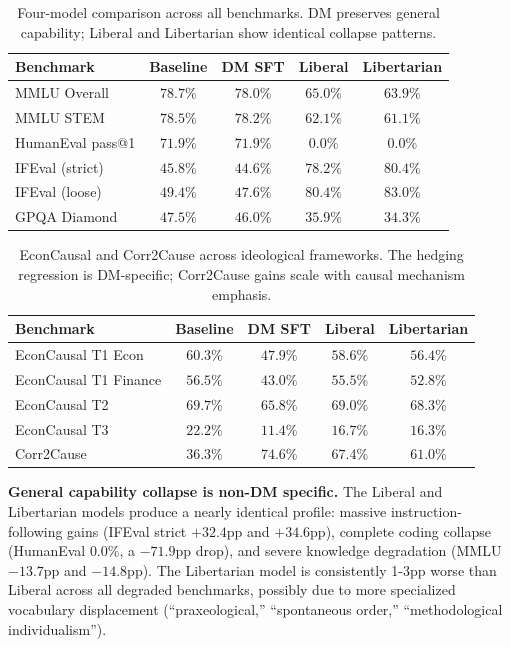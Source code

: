 \documentclass[sigconf]{acmart}
\begin{document}
\begin{table}
\caption{Four-model comparison across all benchmarks. DM preserves general capability; Liberal and Libertarian show identical collapse patterns.}
\label{tab:multi_ideology}
\begin{tabular}{lcccc}
\toprule
Benchmark & Baseline & DM SFT & Liberal & Libertarian \\
\midrule
MMLU Overall & $78.7\%$ & $78.0\%$ & $\mathbf{65.0\%}$ & $\mathbf{63.9\%}$ \\
MMLU STEM & $78.5\%$ & $78.2\%$ & $\mathbf{62.1\%}$ & $\mathbf{61.1\%}$ \\
HumanEval pass@1 & $71.9\%$ & $71.9\%$ & $\mathbf{0.0\%}$ & $\mathbf{0.0\%}$ \\
IFEval (strict) & $45.8\%$ & $44.6\%$ & $\mathbf{78.2\%}$ & $\mathbf{80.4\%}$ \\
IFEval (loose) & $49.4\%$ & $47.6\%$ & $\mathbf{80.4\%}$ & $\mathbf{83.0\%}$ \\
GPQA Diamond & $47.5\%$ & $46.0\%$ & $\mathbf{35.9\%}$ & $\mathbf{34.3\%}$ \\
\bottomrule
\end{tabular}
\end{table}

\begin{table}
\caption{EconCausal and Corr2Cause across ideological frameworks. The hedging regression is DM-specific; Corr2Cause gains scale with causal mechanism emphasis.}
\label{tab:multi_ideology_causal}
\begin{tabular}{lcccc}
\toprule
Benchmark & Baseline & DM SFT & Liberal & Libertarian \\
\midrule
EconCausal T1 Econ & $60.3\%$ & $\mathbf{47.9\%}$ & $58.6\%$ & $56.4\%$ \\
EconCausal T1 Finance & $56.5\%$ & $\mathbf{43.0\%}$ & $55.5\%$ & $52.8\%$ \\
EconCausal T2 & $69.7\%$ & $\mathbf{65.8\%}$ & $69.0\%$ & $68.3\%$ \\
EconCausal T3 & $22.2\%$ & $\mathbf{11.4\%}$ & $16.7\%$ & $16.3\%$ \\
Corr2Cause & $36.3\%$ & $74.6\%$ & $67.4\%$ & $61.0\%$ \\
\bottomrule
\end{tabular}
\end{table}

\textbf{General capability collapse is non-DM specific.} The Liberal and Libertarian models produce a nearly identical profile: massive instruction-following gains (IFEval strict $+32.4$pp and $+34.6$pp), complete coding collapse (HumanEval $0.0\%$, a $-71.9$pp drop), and severe knowledge degradation (MMLU $-13.7$pp and $-14.8$pp). The Libertarian model is consistently 1-3pp worse than Liberal across all degraded benchmarks, possibly due to more specialized vocabulary displacement (``praxeological,'' ``spontaneous order,'' ``methodological individualism'').
\end{document}
